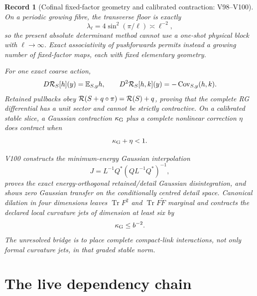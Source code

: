 \documentclass[11pt,oneside]{book}
\newtheorem{record}[theorem]{Record}
\theoremstyle{definition}
\theoremstyle{remark}
\newcommand{\Tr}{\operatorname{Tr}}
\begin{document}
\begin{record}[Cofinal fixed-factor geometry and calibrated
contraction: V98--V100]
\label{rec:e8v1-v98-v100}
On a periodic growing fibre, the transverse floor is exactly
\[
 \lambda_\ell=4\sin^2(\pi/\ell)\asymp\ell^{-2},       \label{eq:e8v1-growing-floor}
\]
so the present absolute determinant method cannot use a one-shot
physical block with \(\ell\to\infty\).  Exact associativity of
pushforwards permits instead a growing number of fixed-factor maps,
each with fixed elementary geometry.

For one exact coarse action,
\[
 D{\cal R}_{S}[h](y)=\mathbb E_{S,y}h,\qquad
 D^2{\cal R}_{S}[h,k](y)
 =-\operatorname{Cov}_{S,y}(h,k).                   \label{eq:e8v1-R-derivatives}
\]
Retained pullbacks obey
\({\cal R}(S+q\circ\pi)={\cal R}(S)+q\), proving that
the complete RG differential has a unit sector and cannot be strictly
contractive.  On a calibrated stable slice, a Gaussian contraction
\(\kappa_{\rm G}\) plus a complete nonlinear correction \(\eta\)
does contract when
\[
 \kappa_{\rm G}+\eta<1.                              \label{eq:e8v1-margin}
\]

V100 constructs the minimum-energy Gaussian interpolation
\[
 J=L^{-1}Q^*(QL^{-1}Q^*)^{-1},                       \label{eq:e8v1-J}
\]
proves the exact energy-orthogonal retained/detail Gaussian
disintegration, and shows zero Gaussian transfer on the conditionally
centred detail space.  Canonical dilation in four dimensions leaves
\(\Tr F^2\) and \(\Tr F\widetilde F\) marginal and contracts the
declared local curvature jets of dimension at least six by
\[
 \kappa_{\rm G}\leq b^{-2}.                          \label{eq:e8v1-kappaG}
\]
The unresolved bridge is to place complete compact-link interactions,
not only formal curvature jets, in that graded stable norm.
\end{record}

\section{The live dependency chain}
\label{sec:e8v1-frontier}
\end{document}
